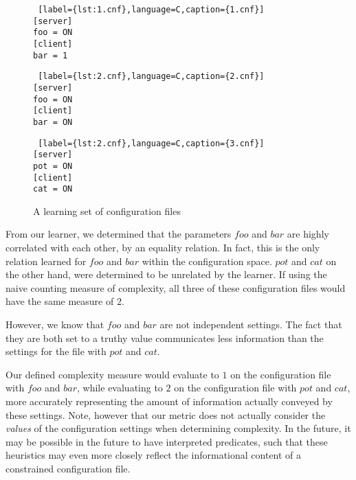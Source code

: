 \begin{figure}[!htb]
    \centering
    \begin{minipage}{.25\textwidth}
    \begin{lstlisting} [label={lst:1.cnf},language=C,caption={1.cnf}]
[server]
foo = ON
[client]
bar = 1
    \end{lstlisting}
    \end{minipage}%
    \hspace{1cm}
    \begin{minipage}{0.25\textwidth}
    \begin{lstlisting} [label={lst:2.cnf},language=C,caption={2.cnf}]
[server]
foo = ON
[client]
bar = ON
    \end{lstlisting}
    \end{minipage}
    \hspace{1cm}
    \begin{minipage}{0.25\textwidth}
    \begin{lstlisting} [label={lst:2.cnf},language=C,caption={3.cnf}]
[server]
pot = ON
[client]
cat = ON
    \end{lstlisting}
    \end{minipage}
    \caption{A learning set of configuration files}
    \label{fig:complexityset}
\end{figure}

From our learner, we determined that the parameters $foo$ and $bar$ are
highly correlated with each other, by an equality relation. In fact, this
is the only relation learned for $foo$ and $bar$ within the configuration
space. $pot$ and $cat$ on the other hand, were determined to be unrelated
by the learner. If using the naive counting measure of complexity, all 
three of these configuration files would have the same measure of $2$.

However, we know that $foo$ and $bar$ are not independent settings.
The fact that they are both set to a truthy value communicates less
information than the settings for the file with $pot$ and $cat$.

Our defined complexity measure would evaluate to $1$ on the
configuration file with $foo$ and $bar$, while evaluating to $2$ on
the configuration file with $pot$ and $cat$, more accurately representing
the amount of information actually conveyed by these settings. Note,
however that our metric does not actually consider the {\it values}
of the configuration settings when determining complexity. In the
future, it may be possible in the future to have interpreted predicates,
such that these heuristics may even more closely reflect the informational
content of a constrained configuration file.

